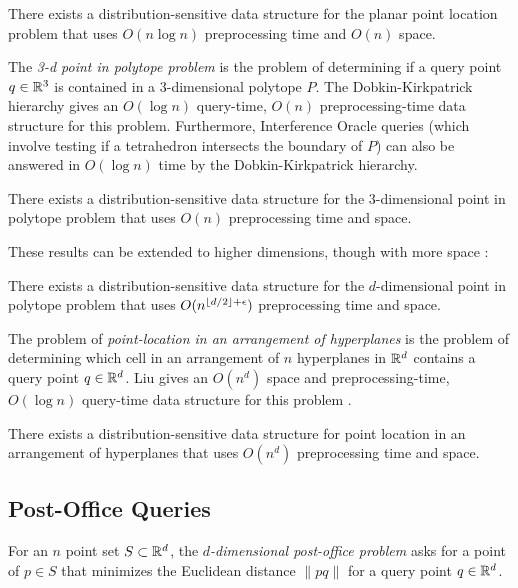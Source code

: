 \documentclass{patmorin}
\begin{document}
\begin{thm}
  There exists a distribution-sensitive data structure for the planar
  point location problem that uses $O(n\log n)$ preprocessing time and
  $O(n)$ space.
\end{thm}

The \emph{3-d point in polytope problem} is the problem of determining if
a query point $q\in\mathbb{R}^3$ is contained in a 3-dimensional polytope $P$.
The Dobkin-Kirkpatrick hierarchy \cite{dk83} gives an $O(\log n)$
query-time, $O(n)$ preprocessing-time data structure for this problem.
Furthermore, Interference Oracle queries (which involve testing if a
tetrahedron intersects the boundary of $P$) can also be answered in $O(\log
n)$ time by the Dobkin-Kirkpatrick hierarchy.

\begin{thm}
  There exists a distribution-sensitive data structure for the
  3-dimensional point in polytope problem that uses $O(n)$ preprocessing
  time and space.
\end{thm}

These results can be extended to higher dimensions, though with more
space \cite{c88}:

\begin{thm}
  There exists a distribution-sensitive data structure for
  the $d$-dimensional point in polytope problem that uses
  $O(n^{{\lfloor d/2 \rfloor}+\epsilon})$ preprocessing time and space.
\end{thm}

The problem of \emph{point-location in an arrangement of hyperplanes} is
the problem of determining which cell in an arrangement of $n$ hyperplanes
in $\mathbb{R}^d$ contains a query point $q\in\mathbb{R}^d$.  Liu gives an $O(n^d)$
space and preprocessing-time, $O(\log n)$ query-time data structure for
this problem \cite{l04}.

\begin{thm}
  There exists a distribution-sensitive data structure for point location
  in an arrangement of hyperplanes that uses $O(n^d)$ preprocessing time
  and space.
\end{thm}

\subsection{Post-Office Queries}

For an $n$ point set $S\subset\mathbb{R}^d$, the \emph{$d$-dimensional post-office
problem} asks for a point of $p\in S$ that minimizes the Euclidean
distance $\|pq\|$ for a query point $q\in\mathbb{R}^d$.
\end{document}
